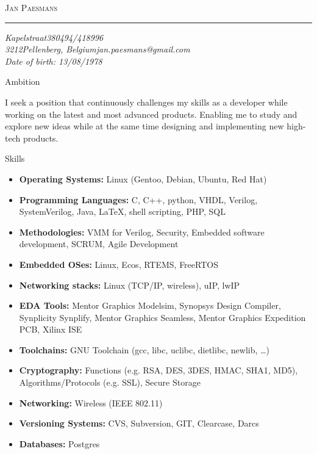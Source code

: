 \documentclass[12pt,oneside]{article}
\makeatletter
\newcommand{\name}{Jan Paesmans}
\newcommand{\street}{Kapelstraat}
\newcommand{\houseno}{38}
\newcommand{\postalcode}{3212}
\newcommand{\city}{Pellenberg}
\newcommand{\country}{Belgium}
\newcommand{\phone}{0494/418996}
\newcommand{\email}{jan.paesmans@gmail.com}
\newcommand{\birthday}{13/08/1978}
\newcommand{\bigname}[1]{
	\begin{center}\selectfont\Huge\scshape#1\end{center}
}
\newenvironment{ressection}[1]{
	\vspace{5pt}
	{\selectfont\Large#1}
	\begin{itemize}
	\vspace{5pt}
}{
	\end{itemize}
}
\newcommand{\ambition}[1]{
	\vspace{5pt}
	{\selectfont\Large Ambition}
	\vspace{5pt}
	\begin{flushleft} #1 \end{flushleft}
	\vspace{5pt}
}
\newcommand{\resitem}[1]{
	\vspace{-4pt}
	\item \begin{flushleft} #1 \end{flushleft}
}
\makeatother
\begin{document}
\fancyhf{}\renewcommand{\headrulewidth}{0pt}

 \selectfont

\bigname{\name}

\vspace{-8pt} \rule{\textwidth}{1pt}

\vspace{-1pt} {\itshape \street \houseno \hfill \phone} \\
\vspace{-1pt} {\itshape \postalcode \city, \country \hfill \email} \\
\vspace{-1pt} {\itshape \hfill Date of birth: \birthday} \\

\vspace{8pt}

\ambition{
I seek a position that continuously challenges my skills as a
developer while working on the latest and most advanced products. Enabling
me to study and explore new ideas while at the same time designing and
implementing new high-tech products.}

\begin{ressection}{Skills}
	\resitem{\textbf{Operating Systems:} Linux (Gentoo, Debian, Ubuntu, Red Hat)}
	\resitem{\textbf{Programming Languages:} C, C++, python, VHDL, Verilog, SystemVerilog, Java, \LaTeX, shell scripting, PHP, SQL}
	\resitem{\textbf{Methodologies:} VMM for Verilog, Security, Embedded software development, SCRUM, Agile Development}
	\resitem{\textbf{Embedded OSes:} Linux, Ecos, RTEMS, FreeRTOS}
	\resitem{\textbf{Networking stacks:} Linux (TCP/IP, wireless), uIP, lwIP}
	\resitem{\textbf{EDA Tools:} Mentor Graphics Modelsim, Synopsys Design Compiler, Synplicity Synplify, Mentor Graphics Seamless, Mentor Graphics Expedition PCB, Xilinx ISE}
	\resitem{\textbf{Toolchains:} GNU Toolchain (gcc, libc, uclibc, dietlibc, newlib, \dots)}
	\resitem{\textbf{Cryptography:} Functions (e.g. RSA, DES, 3DES, HMAC, SHA1, MD5), Algorithms/Protocols (e.g. SSL), Secure Storage}
	\resitem{\textbf{Networking:} Wireless (IEEE 802.11)}
	\resitem{\textbf{Versioning Systems:} CVS, Subversion, GIT, Clearcase, Darcs}
	\resitem{\textbf{Databases:} Postgres}
\end{ressection}
\end{document}

